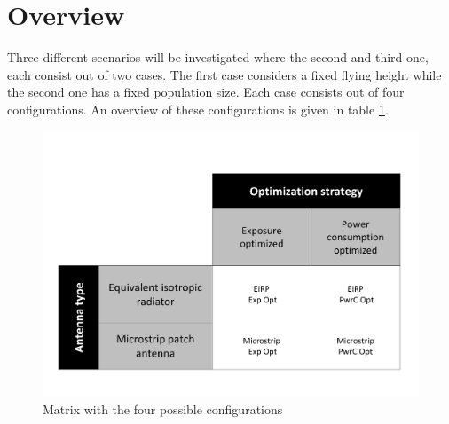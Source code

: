 \section{Overview}
Three different scenarios will be investigated where the second and third one, each consist out of two cases. The first case considers a fixed flying height while 
the second one has a fixed population size. Each case consists out of four configurations. An overview of these configurations is given in table \ref{fig:fourCasesMatrix}.

\begin{figure}[h!]
  \includegraphics[width=\textwidth]{../images/fourCasesMatrix.pdf}
  \caption{Matrix with the four possible configurations}
  \label{fig:fourCasesMatrix}
\end{figure}